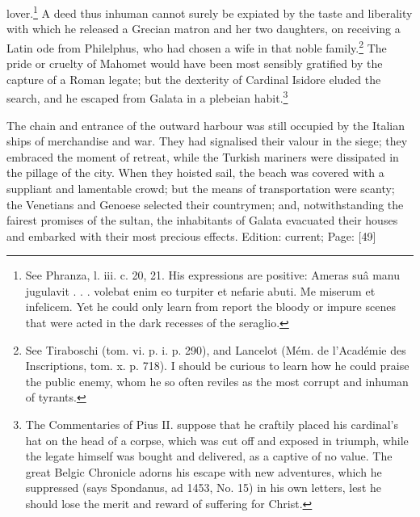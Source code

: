 lover.\footnote{See Phranza, l. iii. c. 20, 21. His expressions are positive: Ameras suâ manu jugulavit . . . volebat enim eo turpiter et nefarie abuti. Me miserum et infelicem. Yet he could only learn from report the bloody or impure scenes that were acted in the dark recesses of the seraglio.} A deed thus inhuman cannot surely be expiated by the taste and liberality with which he released a Grecian matron and her two daughters, on receiving a Latin ode from Philelphus, who had chosen a wife in that noble family.\footnote{See Tiraboschi (tom. vi. p. i. p. 290), and Lancelot (Mém. de l\texthebrew{}’Académie des Inscriptions, tom. x. p. 718). I should be curious to learn how he could praise the public enemy, whom he so often reviles as the most corrupt and inhuman of tyrants.} The pride or cruelty of Mahomet would have been most sensibly gratified by the capture of a Roman legate; but the dexterity of Cardinal Isidore eluded the search, and he escaped from Galata in a plebeian habit.\footnote{The Commentaries of Pius II. suppose that he craftily placed his cardinal\texthebrew{}’s hat on the head of a corpse, which was cut off and exposed in triumph, while the legate himself was bought and delivered, as a captive of no value. The great Belgic Chronicle adorns his escape with new adventures, which he suppressed (says Spondanus, ad 1453, No. 15) in his own letters, lest he should lose the merit and reward of suffering for Christ.}

The chain and entrance of the outward harbour was still occupied by the Italian ships of merchandise and war. They had signalised their valour in the siege; they embraced the moment of retreat, while the Turkish mariners were dissipated in the pillage of the city. When they hoisted sail, the beach was covered with a suppliant and lamentable crowd; but the means of transportation were scanty; the Venetians and Genoese selected their countrymen; and, notwithstanding the fairest promises of the sultan, the inhabitants of Galata evacuated their houses and embarked with their most precious effects.
Edition: current; Page: [49]


